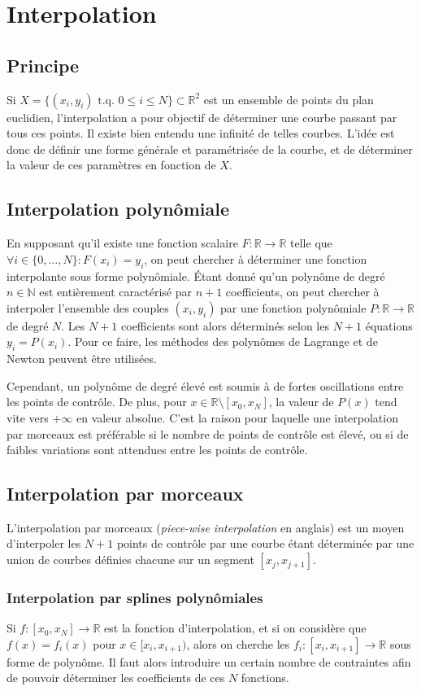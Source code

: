 \documentclass[10pt,journal,compsoc]{IEEEtran}
\newcommand{\tq}{\text{ t.q. }}
\newcommand{\R}{\mathbb R}
\newcommand{\N}{\mathbb N}
\begin{document}
\section{Interpolation}
  \subsection{Principe}
    Si $X = \{(x_i, y_i) \tq 0 \leq i \leq N\} \subset \R^2$ est un ensemble de points du plan euclidien, l'interpolation a pour objectif de déterminer une courbe
    passant par tous ces points. Il existe bien entendu une infinité de telles courbes. L'idée est donc de définir une forme générale et paramétrisée de la courbe,
	et de déterminer la valeur de ces paramètres en fonction de $X$.
  \subsection{Interpolation polynômiale}
    En supposant qu'il existe une fonction scalaire $F : \R \to \R$ telle que $\forall i \in \{0, \ldots, N\} : F(x_i) = y_i$, on peut chercher à déterminer une fonction
	interpolante sous forme polynômiale. Étant donné qu'un polynôme de degré $n \in \N$ est entièrement caractérisé par $n+1$ coefficients, on peut chercher à interpoler
	l'ensemble des couples $(x_i, y_i)$ par une fonction polynômiale $P : \R \to \R$ de degré $N$. Les $N+1$ coefficients sont alors déterminés selon les $N+1$ équations
	$y_i = P(x_i)$. Pour ce faire, les méthodes des polynômes de Lagrange et de Newton peuvent être utilisées.

	Cependant, un polynôme de degré élevé est soumis à de fortes oscillations entre les points de contrôle. De plus, pour $x \in \R \setminus [x_0, x_N]$, la valeur de
	$P(x)$ tend vite vers $+\infty$ en valeur absolue. C'est la raison pour laquelle une interpolation par morceaux est préférable si le nombre de points de contrôle est
	élevé, ou si de faibles variations sont attendues entre les points de contrôle.
  \subsection{Interpolation par morceaux}
    L'interpolation par morceaux (\textit{piece-wise interpolation} en anglais) est un moyen d'interpoler les $N+1$ points de contrôle par une courbe étant déterminée
	par une union de courbes définies chacune sur un segment $[x_j, x_{j+1}]$.
    \subsubsection{Interpolation par splines polynômiales}
      Si $f : [x_0, x_N] \to \R$ est la fonction d'interpolation, et si on considère que $f(x) = f_i(x)$ pour $x \in [x_i, x_{i+1})$, alors on cherche les
	  $f_i : [x_i, x_{i+1}] \to \R$ sous forme de polynôme. Il faut alors introduire un certain nombre de contraintes afin de pouvoir déterminer les coefficients de
	  ces $N$ fonctions.
\end{document}
